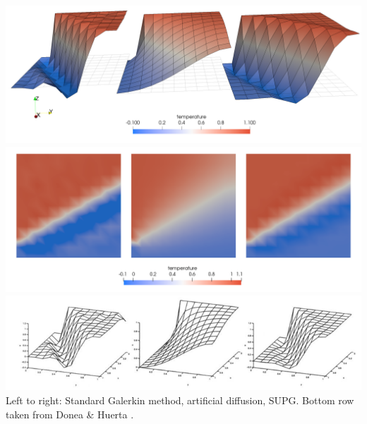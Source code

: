 \begin{center}
\includegraphics[width=15cm]{python_codes/fieldstone_65/results/exp2/Temps}\\
\includegraphics[width=15cm]{python_codes/fieldstone_65/results/exp2/Temps2}\\
\includegraphics[width=15cm]{python_codes/fieldstone_65/images/exp2}\\
{\captionfont Left to right: Standard Galerkin method, artificial diffusion, SUPG. 
Bottom row taken from Donea \& Huerta \cite{dohu03}. }
\end{center}



